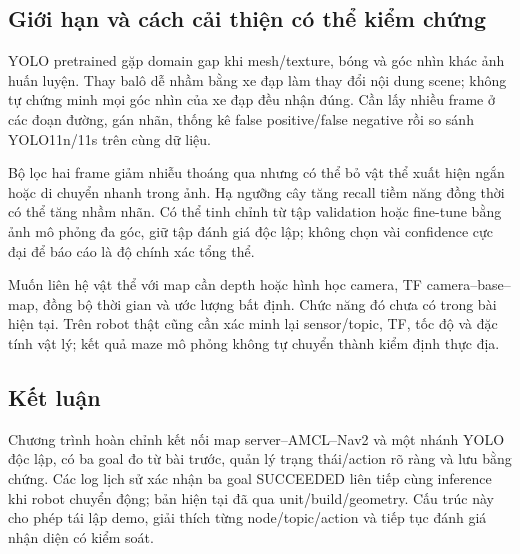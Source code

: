 \subsection{Giới hạn và cách cải thiện có thể kiểm chứng}
YOLO pretrained gặp domain gap khi mesh/texture, bóng và góc nhìn khác ảnh huấn luyện. Thay balô dễ nhầm bằng xe đạp làm thay đổi nội dung scene; không tự chứng minh mọi góc nhìn của xe đạp đều nhận đúng. Cần lấy nhiều frame ở các đoạn đường, gán nhãn, thống kê false positive/false negative rồi so sánh YOLO11n/11s trên cùng dữ liệu.

Bộ lọc hai frame giảm nhiễu thoáng qua nhưng có thể bỏ vật thể xuất hiện ngắn hoặc di chuyển nhanh trong ảnh. Hạ ngưỡng cây tăng recall tiềm năng đồng thời có thể tăng nhầm nhãn. Có thể tinh chỉnh từ tập validation hoặc fine-tune bằng ảnh mô phỏng đa góc, giữ tập đánh giá độc lập; không chọn vài confidence cực đại để báo cáo là độ chính xác tổng thể.

Muốn liên hệ vật thể với map cần depth hoặc hình học camera, TF camera--base--map, đồng bộ thời gian và ước lượng bất định. Chức năng đó chưa có trong bài hiện tại. Trên robot thật cũng cần xác minh lại sensor/topic, TF, tốc độ và đặc tính vật lý; kết quả maze mô phỏng không tự chuyển thành kiểm định thực địa.
\subsection{Kết luận}
Chương trình hoàn chỉnh kết nối map server--AMCL--Nav2 và một nhánh YOLO độc lập, có ba goal đo từ bài trước, quản lý trạng thái/action rõ ràng và lưu bằng chứng. Các log lịch sử xác nhận ba goal SUCCEEDED liên tiếp cùng inference khi robot chuyển động; bản hiện tại đã qua unit/build/geometry. Cấu trúc này cho phép tái lập demo, giải thích từng node/topic/action và tiếp tục đánh giá nhận diện có kiểm soát.
\clearpage

